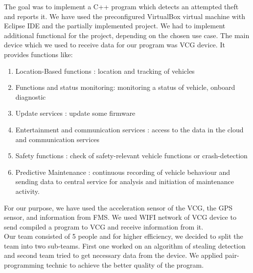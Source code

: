 The goal was to implement a C++ program which detects an attempted theft and reports it. We have used the preconfigured VirtualBox virtual machine with Eclipse IDE and the partially implemented project. We had to implement additional functional for the project, depending on the chosen use case.  The main device which we used to receive data for our program was VCG device. It provides functions like: 
\begin{enumerate}
	\item Location-Based functions : location and tracking of vehicles 
	\item Functions and status monitoring:  monitoring a status of vehicle, onboard diagnostic
	\item Update services : update some firmware
	\item Entertainment and communication services : access to the data in the cloud and communication services
	\item Safety functions : check of safety-relevant vehicle functions or crash-detection
	\item Predictive Maintenance : continuous recording of vehicle behaviour and sending data to central service for analysis and initiation of maintenance activity.
\end{enumerate}
For our purpose, we have used the acceleration sensor of the VCG, the GPS sensor, and information from FMS. We used WIFI network of VCG device to send compiled a program to VCG and receive information from it.\\
Our team consisted of 5 people and for higher efficiency, we decided to split the team into two sub-teams. First one worked on an algorithm of stealing detection and second team tried to get necessary data from the device. We applied pair-programming technic to achieve the better quality of the program.\\